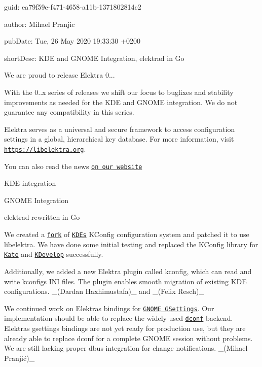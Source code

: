 
\begin{DoxyItemize}
\item guid\+: ea79f59e-\/f471-\/4658-\/a11b-\/1371802814c2
\item author\+: Mihael Pranjic
\item pub\+Date\+: Tue, 26 May 2020 19\+:33\+:30 +0200
\item short\+Desc\+: K\+DE and G\+N\+O\+ME Integration, {\ttfamily elektrad} in Go
\end{DoxyItemize}

We are proud to release Elektra 0...

With the 0..\+x series of releases we shift our focus to bugfixes and stability improvements as needed for the K\+DE and G\+N\+O\+ME integration. We do not guarantee any compatibility in this series.

Elektra serves as a universal and secure framework to access configuration settings in a global, hierarchical key database. For more information, visit \href{https://libelektra.org}{\tt https\+://libelektra.\+org}.

You can also read the news \href{https://www.libelektra.org/news/0.9.2-release}{\tt on our website}


\begin{DoxyItemize}
\item K\+DE integration
\item G\+N\+O\+ME Integration
\item {\ttfamily elektrad} rewritten in Go
\end{DoxyItemize}

We created a \href{https://github.com/ElektraInitiative/kconfig}{\tt fork} of \href{https://kde.org/}{\tt K\+DE\textquotesingle{}s} {\ttfamily K\+Config} configuration system and patched it to use libelektra. We have done some initial testing and replaced the {\ttfamily K\+Config} library for \href{https://kate-editor.org/}{\tt Kate} and \href{https://www.kdevelop.org/}{\tt K\+Develop} successfully.

Additionally, we added a new Elektra plugin called {\ttfamily kconfig}, which can read and write kconfig\textquotesingle{}s I\+NI files. The plugin enables smooth migration of existing K\+DE configurations. \+\_\+(\+Dardan Haxhimustafa)\+\_\+ and \+\_\+(\+Felix Resch)\+\_\+

We continued work on Elektra\textquotesingle{}s bindings for \href{https://developer.gnome.org/gio/stable/GSettings.html}{\tt G\+N\+O\+ME G\+Settings}. Our implementation should be able to replace the widely used \href{https://wiki.gnome.org/Projects/dconf}{\tt dconf} backend. Elektra\textquotesingle{}s {\ttfamily gsettings} bindings are not yet ready for production use, but they are already able to replace {\ttfamily dconf} for a complete G\+N\+O\+ME session without problems. We are still lacking proper dbus integration for change notifications. \+\_\+(Mihael Pranjić)\+\_\+

